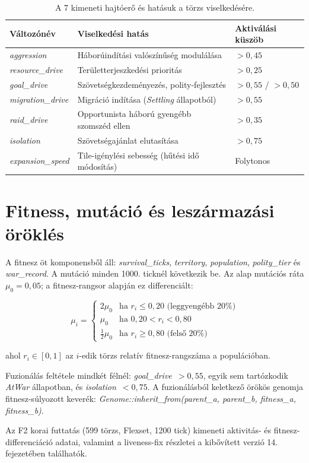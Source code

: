 \begin{table}[h]
  \centering
  \caption{A 7 kimeneti hajtóerő és hatásuk a törzs viselkedésére.}
  \label{tab:neurosim-outputs}
  \begin{tabular}{lll}
    \hline
    \textbf{Változónév} & \textbf{Viselkedési hatás} & \textbf{Aktiválási küszöb} \\
    \hline
    \textit{aggression}      & Háborúindítási valószínűség modulálása       & $> 0{,}45$ \\
    \textit{resource\_drive} & Területterjeszkedési prioritás                & $> 0{,}25$ \\
    \textit{goal\_drive}     & Szövetségkezdeményezés, polity-fejlesztés     & $> 0{,}55$ / $> 0{,}50$ \\
    \textit{migration\_drive}& Migráció indítása (\textit{Settling} állapotból) & $> 0{,}55$ \\
    \textit{raid\_drive}     & Opportunista háború gyengébb szomszéd ellen  & $> 0{,}35$ \\
    \textit{isolation}       & Szövetségajánlat elutasítása                 & $> 0{,}75$ \\
    \textit{expansion\_speed}& Tile-igénylési sebesség (hűtési idő módosítás) & Folytonos \\
    \hline
  \end{tabular}
\end{table}

\section{Fitness, mutáció és leszármazási öröklés}

A fitnesz öt komponensből áll: \textit{survival\_ticks}, \textit{territory}, \textit{population}, \textit{polity\_tier} és \textit{war\_record}. A mutáció minden 1000. ticknél következik be. Az alap mutációs ráta $\mu_0 = 0{,}05$; a fitnesz-rangsor alapján ez differenciált:

\begin{equation}
\mu_i =
\begin{cases}
2\mu_0 & \text{ha } r_i \leq 0{,}20 \text{ (leggyengébb 20\%)} \\
\mu_0  & \text{ha } 0{,}20 < r_i < 0{,}80 \\
\tfrac{1}{2}\mu_0 & \text{ha } r_i \geq 0{,}80 \text{ (felső 20\%)}
\end{cases}
\end{equation}

ahol $r_i \in [0,1]$ az $i$-edik törzs relatív fitnesz-rangszáma a populációban.

Fuzionálás feltétele mindkét félnél: \textit{goal\_drive}~$> 0{,}55$, egyik sem tartózkodik \textit{AtWar} állapotban, és \textit{isolation}~$< 0{,}75$. A fuzionálásból keletkező örökös genomja fitnesz-súlyozott keverék: \textit{Genome::inherit\_from(parent\_a, parent\_b, fitness\_a, fitness\_b)}.

Az F2 korai futtatás (599 törzs, Flexset, 1200 tick) kimeneti aktivitás- és fitnesz-differenciáció adatai, valamint a liveness-fix részletei a kibővített verzió 14. fejezetében találhatók.
